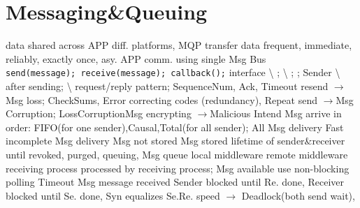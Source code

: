\section{Messaging\&Queuing}
data shared across APP diff. platforms, 
MQP transfer data frequent, immediate, reliably, 
exactly once, asy.
APP comm. using single Msg Bus
\\
\lstinline{send(message); receive(message); callback();}
interface
\textbackslash
{};
\textbackslash
{};
;
Sender 
\textbackslash
{}
after sending;
\textbackslash
{}
request/reply pattern;
\textbar \textbar \textbar
{}
SequenceNum,
Ack, 
Timeout resend
$\rightarrow$Msg loss;
CheckSums, 
Error correcting codes (redundancy),
Repeat send
$\rightarrow$Msg Corruption;
Loss\redtext{+}Corruption\redtext{+}Msg encrypting
$\rightarrow$Malicious Intend
Msg arrive in order:
FIFO(for one sender),Causal,Total(for all sender);
All Msg delivery
Fast incomplete Msg delivery
Msg not stored
Msg stored lifetime of sender\&receiver 
until revoked, purged, queuing, Msg queue
\textbar
{}
local middleware
\greentext{\textbackslash}
remote middleware
\greentext{\textbackslash}
receiving process
\greentext{\textbackslash}
processed by receiving process;
Msg available use non-blocking polling
\greentext{\textbackslash}
Timeout
\greentext{\textbackslash}
Msg message received
\textbar
{}
Sender blocked until Re. done,
Receiver blocked until Se. done,
Syn equalizes Se.Re. speed
$\rightarrow$
Deadlock(both send wait),
